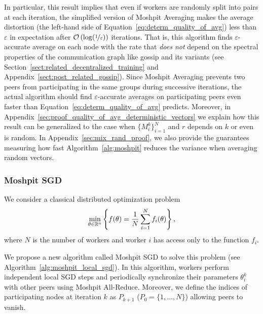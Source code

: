 In particular, this result implies that even if workers are randomly split into pairs at each iteration, the simplified version of Moshpit Averaging makes the average distortion (the left-hand side of Equation~\ref{eq:determ_quality_of_avg}) less than $\varepsilon$ in expectation after ${\cal O}\left(\log(\nicefrac{1}{\varepsilon})\right)$ iterations. That is, this algorithm finds $\varepsilon$-accurate average on each node with the rate that \textit{does not} depend on the spectral properties of the communication graph like gossip and its variants (see Section~\ref{sect:related_decentralized_training} and Appendix~\ref{sect:post_related_gossip}). Since Moshpit Averaging prevents two peers from participating in the same groups during successive iterations, the actual algorithm should find $\varepsilon$-accurate averages on participating peers even faster than Equation~\ref{eq:determ_quality_of_avg} predicts. Moreover, in Appendix~\ref{sec:proof_quality_of_avg_deterministic_vectors} we explain how this result can be generalized to the case when $\{M_i^k\}_{i=1}^N$ and $r$ depends on $k$ or even is random. In Appendix~\ref{sec:mix_rand_proof}, we also provide the guarantees measuring how fast Algorithm~\ref{alg:moshpit} reduces the variance when averaging random vectors.

\vspace{-4pt}
\subsubsection{Moshpit SGD}\label{sect:optim_theory}
We consider a classical distributed optimization problem
\vspace{-6pt}
\begin{equation}
    \min\limits_{\theta\in\mathbb{R}^n}\left\{f(\theta) = \frac{1}{N}\sum\limits_{i=1}^N f_i(\theta)\right\}, \label{eq:main_problem}
\end{equation}
\vspace{-6pt}
where $N$ is the number of workers and worker $i$ has access only to the function $f_i$.

We propose a new algorithm called Moshpit SGD to solve this problem (see Algorithm~\ref{alg:moshpit_local_sgd}). In this algorithm, workers perform independent local SGD steps and periodically synchronize their parameters $\theta_i^k$ with other peers using Moshpit All-Reduce. Moreover, we define the indices of participating nodes at iteration $k$ as $P_{k+1}$ ($P_0 = \{1,\ldots,N\}$) allowing peers to vanish.


